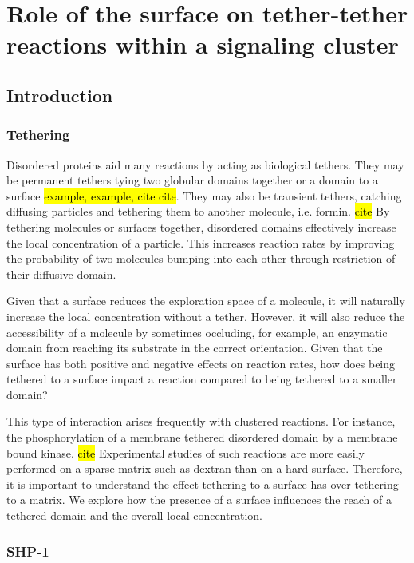 \documentclass[../../AdvancementSummary.tex]{subfiles}
\begin{document}
\section{Role of the surface on tether-tether reactions within a signaling cluster}

\subsection{Introduction}
\subsubsection{Tethering}

Disordered proteins aid many reactions by acting as biological tethers. They may be permanent tethers tying two globular domains together or a domain to a surface \hl{example, example, cite cite}.  They may also be transient tethers, catching diffusing particles and tethering them to another molecule, i.e. formin. \hl{cite} By tethering molecules or surfaces together, disordered domains effectively increase the local concentration of a particle. This increases reaction rates by improving the probability of two molecules bumping into each other through restriction of their diffusive domain.

Given that a surface reduces the exploration space of a molecule, it will naturally increase the local concentration without a tether. However, it will also reduce the accessibility of a molecule by sometimes occluding, for example, an enzymatic domain from reaching its substrate in the correct orientation. Given that the surface has both positive and negative effects on reaction rates, how does being tethered to a surface impact a reaction compared to being tethered to a smaller domain? 

This type of interaction arises frequently with clustered reactions.  For instance, the phosphorylation of a membrane tethered disordered domain by a membrane bound kinase. \hl{cite} Experimental studies of such reactions are more easily performed on a sparse matrix such as dextran than on a hard surface. Therefore, it is important to understand the effect tethering to a surface has over tethering to a matrix. We explore how the presence of a surface influences the reach of a tethered domain and the overall local concentration.

\subsubsection{SHP-1}
\end{document}
